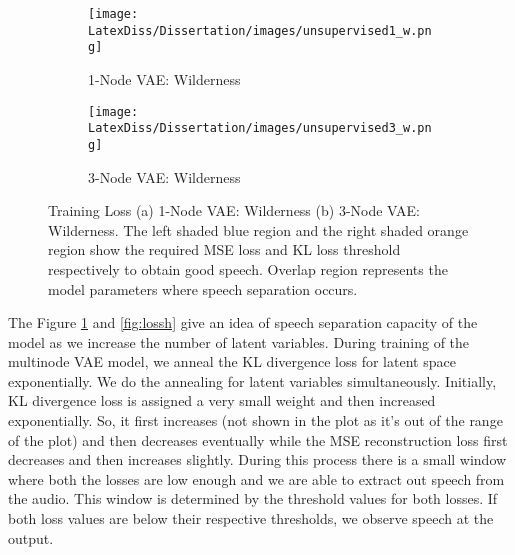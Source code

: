 \begin{figure}[h!]
    \begin{subfigure}{0.4\textwidth}
    \centering
    \texttt{[image: LatexDiss/Dissertation/images/unsupervised1\_w.png]}
    \caption{1-Node VAE: Wilderness}
    \end{subfigure}
    \vspace{0pt} \newline
    \begin{subfigure}{0.4\textwidth}
    \centering
    \texttt{[image: LatexDiss/Dissertation/images/unsupervised3\_w.png]}
    \caption{3-Node VAE: Wilderness}
    \end{subfigure}
    \caption{Training Loss (a) 1-Node VAE: Wilderness (b) 3-Node VAE: Wilderness. The left shaded blue region and the right shaded orange region show the required MSE loss and KL loss threshold respectively to obtain good speech. Overlap region represents the model parameters where speech separation occurs.}
    \label{fig:lossw}
\end{figure}




The Figure \ref{fig:lossw} and \ref{fig:lossh} give an idea of speech separation capacity of the model as we increase the number of latent variables. During training of the multinode VAE model, we anneal the KL divergence loss for latent space exponentially. We do the annealing for latent variables simultaneously. Initially, KL divergence loss is assigned a very small weight and then increased exponentially. So, it first increases (not shown in the plot as it's out of the range of the plot) and then decreases eventually while the MSE reconstruction loss first decreases and then increases slightly. During this process there is a small window where both the losses are low enough and we are able to extract out speech from the audio. This window is determined by the threshold values for both losses. If both loss values are below their respective thresholds, we observe speech at the output.\\


